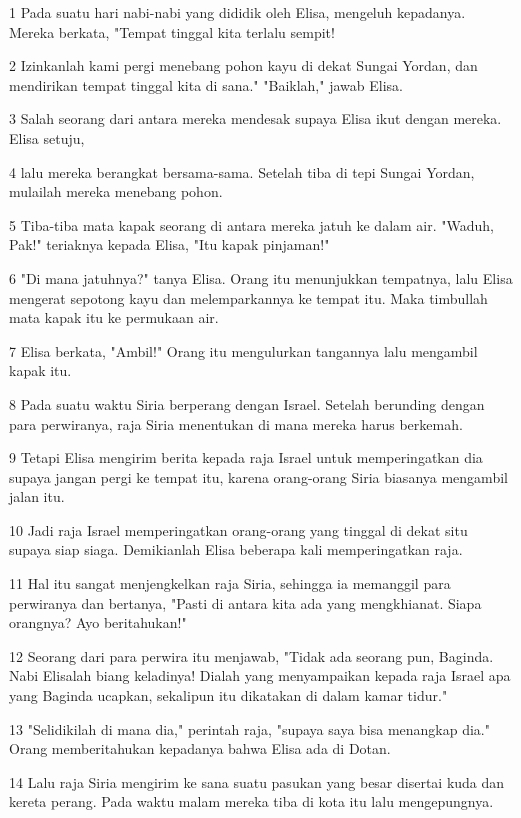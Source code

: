 \par 1 Pada suatu hari nabi-nabi yang dididik oleh Elisa, mengeluh kepadanya. Mereka berkata, "Tempat tinggal kita terlalu sempit!
\par 2 Izinkanlah kami pergi menebang pohon kayu di dekat Sungai Yordan, dan mendirikan tempat tinggal kita di sana." "Baiklah," jawab Elisa.
\par 3 Salah seorang dari antara mereka mendesak supaya Elisa ikut dengan mereka. Elisa setuju,
\par 4 lalu mereka berangkat bersama-sama. Setelah tiba di tepi Sungai Yordan, mulailah mereka menebang pohon.
\par 5 Tiba-tiba mata kapak seorang di antara mereka jatuh ke dalam air. "Waduh, Pak!" teriaknya kepada Elisa, "Itu kapak pinjaman!"
\par 6 "Di mana jatuhnya?" tanya Elisa. Orang itu menunjukkan tempatnya, lalu Elisa mengerat sepotong kayu dan melemparkannya ke tempat itu. Maka timbullah mata kapak itu ke permukaan air.
\par 7 Elisa berkata, "Ambil!" Orang itu mengulurkan tangannya lalu mengambil kapak itu.
\par 8 Pada suatu waktu Siria berperang dengan Israel. Setelah berunding dengan para perwiranya, raja Siria menentukan di mana mereka harus berkemah.
\par 9 Tetapi Elisa mengirim berita kepada raja Israel untuk memperingatkan dia supaya jangan pergi ke tempat itu, karena orang-orang Siria biasanya mengambil jalan itu.
\par 10 Jadi raja Israel memperingatkan orang-orang yang tinggal di dekat situ supaya siap siaga. Demikianlah Elisa beberapa kali memperingatkan raja.
\par 11 Hal itu sangat menjengkelkan raja Siria, sehingga ia memanggil para perwiranya dan bertanya, "Pasti di antara kita ada yang mengkhianat. Siapa orangnya? Ayo beritahukan!"
\par 12 Seorang dari para perwira itu menjawab, "Tidak ada seorang pun, Baginda. Nabi Elisalah biang keladinya! Dialah yang menyampaikan kepada raja Israel apa yang Baginda ucapkan, sekalipun itu dikatakan di dalam kamar tidur."
\par 13 "Selidikilah di mana dia," perintah raja, "supaya saya bisa menangkap dia." Orang memberitahukan kepadanya bahwa Elisa ada di Dotan.
\par 14 Lalu raja Siria mengirim ke sana suatu pasukan yang besar disertai kuda dan kereta perang. Pada waktu malam mereka tiba di kota itu lalu mengepungnya.
